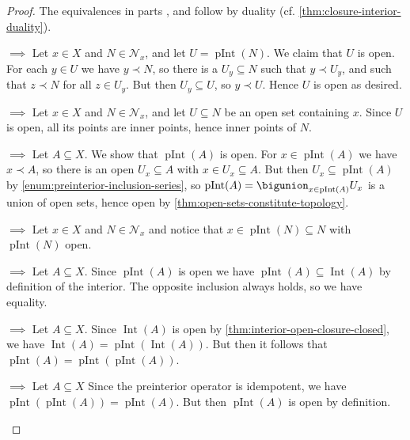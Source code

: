 \documentclass[article, a4paper, 11pt, oneside]{memoir}
\numberwithin{equation}{chapter}
\newcommand{\inpoint}{\prec}
\newcommand{\calN}{\mathcal{N}}
\newcommand{\nhoods}[1]{\calN_{#1}}
\newcommand{\pInt}[1]{\operatorname{pInt}(#1)}
\renewcommand{\interior}[1]{\operatorname{Int}(#1)}
\begin{document}
\begin{proof}
The equivalences in parts ,  and  follow by duality (cf. \cref{thm:closure-interior-duality}).
%
\begin{proofsec}
    \item[\subcref{enum:topology-filterbasis-intuition} $\implies$ \subcref{enum:topology-filterbasis}]
    Let $x \in X$ and $N \in \nhoods{x}$, and let $U = \pInt{N}$. We claim that $U$ is open. For each $y \in U$ we have $y \inpoint N$, so there is a $U_y \subseteq N$ such that $y \inpoint U_y$, and such that $z \inpoint N$ for all $z \in U_y$. But then $U_y \subseteq U$, so $y \inpoint U$. Hence $U$ is open as desired.
    
    \item[\subcref{enum:topology-filterbasis} $\implies$ \subcref{enum:topology-filterbasis-intuition}]
    Let $x \in X$ and $N \in \nhoods{x}$, and let $U \subseteq N$ be an open set containing $x$. Since $U$ is open, all its points are inner points, hence inner points of $N$.

    \item[\subcref{enum:topology-filterbasis} $\implies$ \subcref{enum:topology-preclosure-always-closed}]
    Let $A \subseteq X$. We show that $\pInt{A}$ is open. For $x \in \pInt{A}$ we have $x \inpoint A$, so there is an open $U_x \subseteq A$ with $x \in U_x \subseteq A$. But then $U_x \subseteq \pInt{A}$ by \cref{enum:preinterior-inclusion-series}, so $\pInt{A} = \bigunion_{x \in \pInt{A}} U_x$ is a union of open sets, hence open by \cref{thm:open-sets-constitute-topology}.

    \item[\subcref{enum:topology-preclosure-always-closed} $\implies$ \subcref{enum:topology-filterbasis}]
    Let $x \in X$ and $N \in \nhoods{x}$ and notice that $x \in \pInt{N} \subseteq N$ with $\pInt{N}$ open.

    \item[\subcref{enum:topology-preclosure-always-closed} $\implies$ \subcref{enum:topology-preclosure-closure-equal}]
    Let $A \subseteq X$. Since $\pInt{A}$ is open we have $\pInt{A} \subseteq \interior{A}$ by definition of the interior. The opposite inclusion always holds, so we have equality.

    \item[\subcref{enum:topology-preclosure-closure-equal} $\implies$ \subcref{enum:topology-idempotence}]
    Let $A \subseteq X$. Since $\interior{A}$ is open by \cref{thm:interior-open-closure-closed}, we have $\interior{A} = \pInt{\interior{A}}$. But then it follows that $\pInt{A} = \pInt{\pInt{A}}$.

    \item[\subcref{enum:topology-idempotence} $\implies$ \subcref{enum:topology-preclosure-always-closed}]
    Let $A \subseteq X$ Since the preinterior operator is idempotent, we have $\pInt{\pInt{A}} = \pInt{A}$. But then $\pInt{A}$ is open by definition.
\end{proofsec}
\end{proof}
\end{document}
